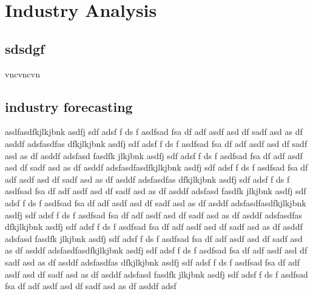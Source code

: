 \documentclass[11pt]{article}
\begin{document}
\newpage{}
\section{Industry Analysis}
\subsection{ sdsdgf }
vncvncvn
\subsection{ industry forecasting }
asdfasdfkjlkjbnk asdfj sdf adsf f ds f asdfsad fsa df adf asdf asd df sadf asd as df asddf adsfasdfas dfkjlkjbnk asdfj sdf adsf f ds f asdfsad fsa df adf asdf asd df sadf asd as df asddf adsfasd  fasdfk  jlkjbnk asdfj sdf adsf f ds f asdfsad fsa df adf asdf asd df sadf asd as df asddf adsfasdfasdfkjlkjbnk asdfj sdf adsf f ds f asdfsad fsa df adf asdf asd df sadf asd as df asddf adsfasdfas dfkjlkjbnk asdfj sdf adsf f ds f asdfsad fsa df adf asdf asd df sadf asd as df asddf adsfasd  fasdfk  jlkjbnk asdfj sdf adsf f ds f asdfsad fsa df adf asdf asd df sadf asd as df asddf adsfasdfasdfkjlkjbnk asdfj sdf adsf f ds f asdfsad fsa df adf asdf asd df sadf asd as df asddf adsfasdfas dfkjlkjbnk asdfj sdf adsf f ds f asdfsad fsa df adf asdf asd df sadf asd as df asddf adsfasd  fasdfk  jlkjbnk asdfj sdf adsf f ds f asdfsad fsa df adf asdf asd df sadf asd as df asddf adsfasdfasdfkjlkjbnk asdfj sdf adsf f ds f asdfsad fsa df adf asdf asd df sadf asd as df asddf adsfasdfas dfkjlkjbnk asdfj sdf adsf f ds f asdfsad fsa df adf asdf asd df sadf asd as df asddf adsfasd  fasdfk  jlkjbnk asdfj sdf adsf f ds f asdfsad fsa df adf asdf asd df sadf asd as df asddf adsf
\end{document}
